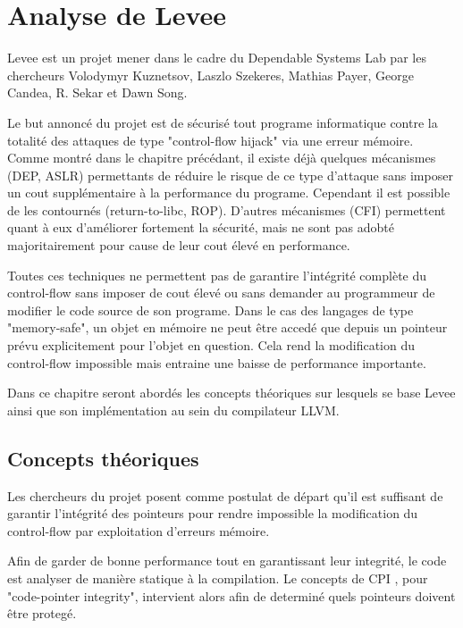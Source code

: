 \chapter{Analyse de Levee}
\label{chap:levee}


Levee est un projet mener dans le cadre du Dependable Systems Lab \cite{dslab} par les chercheurs Volodymyr Kuznetsov, Laszlo Szekeres, Mathias Payer, George Candea, R. Sekar et Dawn Song.

Le but annoncé du projet est de sécurisé tout programe informatique contre la totalité des attaques de type "control-flow hijack" via une erreur mémoire. Comme montré dans le chapitre précédant, il existe déjà quelques mécanismes (DEP, ASLR) permettants de réduire le risque de ce type d'attaque sans imposer un cout supplémentaire à la performance du programe. Cependant il est possible de les contournés (return-to-libc, ROP). D'autres mécanismes (CFI) permettent quant à eux d'améliorer fortement la sécurité, mais ne sont pas adobté majoritairement pour cause de leur cout élevé en performance.

Toutes ces techniques ne permettent pas de garantire l'intégrité complète du control-flow sans imposer de cout élevé ou sans demander au programmeur de modifier le code source de son programe. Dans le cas des langages de type "memory-safe", un objet en mémoire ne peut être accedé que depuis un pointeur prévu explicitement pour l'objet en question. Cela rend la modification du control-flow impossible mais entraine une baisse de performance importante.

Dans ce chapitre seront abordés les concepts théoriques sur lesquels se base Levee ainsi que son implémentation au sein du compilateur LLVM.

\minitoc

\newpage

\section{Concepts théoriques}

Les chercheurs du projet posent comme postulat de départ qu'il est suffisant de garantir l'intégrité des pointeurs pour rendre impossible la modification du control-flow par exploitation d'erreurs mémoire.

Afin de garder de bonne performance tout en garantissant leur integrité, le code est analyser de manière statique à la compilation. Le concepts de CPI \cite{CPIPaper}, pour "code-pointer integrity", intervient alors afin de determiné quels pointeurs doivent être protegé.

